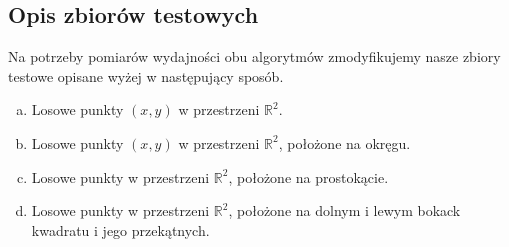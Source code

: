 \subsection{Opis zbiorów testowych}
\quad Na potrzeby pomiarów wydajności obu algorytmów zmodyfikujemy nasze zbiory testowe 
opisane wyżej w następujący sposób.
\begin{enumerate}[a)]
    \item Losowe punkty $(x, y)$ w przestrzeni $\mathbb{R}^2$.
    \item Losowe punkty $(x, y)$ w przestrzeni $\mathbb{R}^2$, położone na okręgu.
    \item Losowe punkty w przestrzeni $\mathbb{R}^2$, 
    położone na prostokącie.
    \item Losowe punkty w przestrzeni $\mathbb{R}^2$, 
    położone na dolnym i lewym bokack kwadratu i jego przekątnych.
\end{enumerate}
